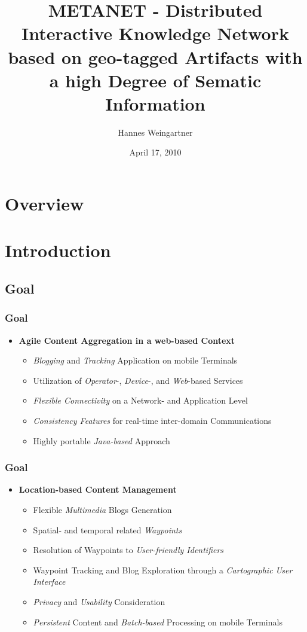 \documentclass[blue]{beamer}
\title{METANET - Distributed Interactive Knowledge Network based on geo-tagged Artifacts with a high Degree of Sematic Information}
\institute[META-D.O.N]{META-D.O.N\\Association for Cultural Substitution Services}
\author{Hannes Weingartner}
\date{April 17, 2010}
\begin{document}
\frame{\titlepage}

\section*{Overview}
\frame{\tableofcontents}




\section{Introduction}
\subsection{Goal}
\frame
{
\frametitle{\textbf{Goal}}
\begin{itemize}
\item \textbf{Agile Content Aggregation in a web-based Context}
  \begin{itemize}
    \item \textit{Blogging} and \textit{Tracking} Application on mobile Terminals
    \item Utilization of \textit{Operator}-, \textit{Device}-, and \textit{Web}-based Services
    \item \textit{Flexible Connectivity} on a Network- and Application Level
    \item \textit{Consistency Features} for real-time inter-domain Communications
    \item Highly portable \textit{Java-based} Approach
  \end{itemize}
\end{itemize}
}

\frame
{
\frametitle{\textbf{Goal}}
\begin{itemize}
\item \textbf{Location-based Content Management}
  \begin{itemize}
    \item Flexible \textit{Multimedia} Blogs Generation
    \item Spatial- and temporal related \textit{Waypoints}
    \item Resolution of Waypoints to \textit{User-friendly Identifiers}
    \item Waypoint Tracking and Blog Exploration through a \textit{Cartographic User Interface}
    \item \textit{Privacy} and \textit{Usability} Consideration
    \item \textit{Persistent} Content and \textit{Batch-based} Processing on mobile Terminals
  \end{itemize}
\end{itemize}
}
\end{document}
